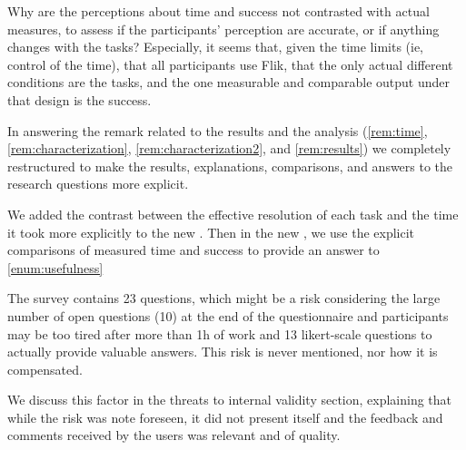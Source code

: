 \begin{remark} \label{rem:time}
Why are the perceptions about time and success not contrasted with actual measures, to assess if the participants' perception are accurate, or if anything changes with the tasks? Especially, it seems that, given the time limits (ie, control of the time), that all participants use Flik, that the only actual different conditions are the tasks, and the one measurable and comparable output under that design is the success.
\end{remark}
\begin{solved}
In answering the remark related to the results and the analysis (\ref{rem:time}, \ref{rem:characterization}, \ref{rem:characterization2}, and \ref{rem:results}) we completely restructured  to make the results, explanations, comparisons, and answers to the research questions more explicit.

We added the contrast between the effective resolution of each task and the time it took more explicitly to the new . Then in the new , we use the explicit comparisons of measured time and success to provide an answer to \ref{enum:usefulness}
\end{solved}

\begin{remark} \label{rem:survey}
The survey contains 23 questions, which might be a risk considering the large number of open questions (10) at the end of the questionnaire and participants may be too tired after more than 1h of work and 13 likert-scale questions to actually provide valuable answers. This risk is never mentioned, nor how it is compensated.
\end{remark}
\begin{solved}
We discuss this factor in the threats to internal validity section, explaining that while the risk was note foreseen, it did not present itself and the feedback and comments received by the users was relevant and of quality.
\end{solved}

